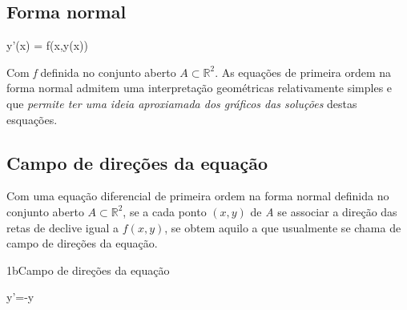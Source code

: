 \documentclass["AM3C-Slides_annotations.tex"]{subfiles}
\begin{document}
\begin{sectionBox}
  \subsection*{Forma normal}
  \begin{BM}
    y'(x) = f(x,y(x))
  \end{BM}
  Com \textit{f} definida no conjunto aberto \(A\subset\mathbb{R}^2\).
  As equações de primeira ordem na forma normal admitem uma interpretação geométricas relativamente simples e que \emph{permite ter uma ideia aproxiamada dos gráficos das soluções} destas esquações.
  
  \subsection*{Campo de direções da equação}
  Com uma equação diferencial de primeira ordem na forma normal definida no conjunto aberto \(A\subset\mathbb{R}^2\), se a cada ponto \((x,y)\) de \textit{A} se associar a direção das retas de declive igual a \(f(x,y)\), se obtem aquilo a que usualmente se chama de campo de direções da equação.

  \begin{exampleBox}1b{Campo de direções da equação} %
    \begin{BM}
      y'=-y
    \end{BM}
    \begin{center}
    \end{center}
    
  \end{exampleBox}
\end{sectionBox}
\end{document}
